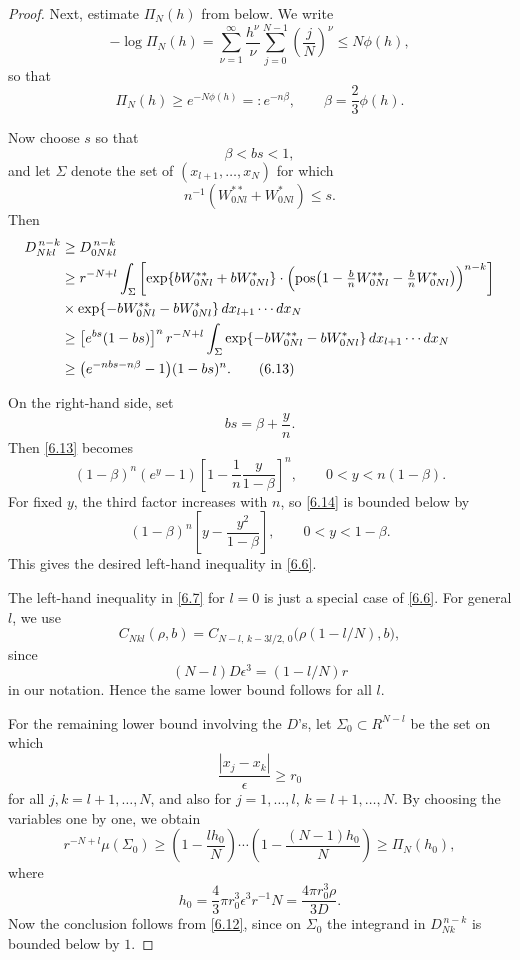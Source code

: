 \documentclass[11pt]{article}
\begin{document}
\begin{proof}
Next, estimate $\Pi_N(h)$ from below. We write
\begin{equation*}
-\log \Pi_N(h)
=
\sum_{\nu=1}^\infty \frac{h^\nu}{\nu}\sum_{j=0}^{N-1}\left(\frac{j}{N}\right)^\nu
\le N\phi(h),
\tag{6.12}\label{6.12}
\end{equation*}
so that
\[
\Pi_N(h)\ge e^{-N\phi(h)}=:e^{-n\beta},
\qquad
\beta=\frac{2}{3}\phi(h).
\]

Now choose $s$ so that
\[
\beta<bs<1,
\]
and let $\Sigma$ denote the set of $(x_{l+1},\dots,x_N)$ for which
\[
n^{-1}(W^{**}_{0Nl}+W^{*}_{0Nl})\le s.
\]
Then
\begin{align*}
D^{\,n-k}_{Nkl}
&\ge D^{\,n-k}_{0Nkl}
\notag\\
&\ge
r^{-N+l}\int_\Sigma
\left[
\exp\{bW^{**}_{0Nl}+bW^{*}_{0Nl}\}
\cdot
\Bigl(\mathrm{pos}\bigl(1-\tfrac{b}{n}W^{**}_{0Nl}-\tfrac{b}{n}W^{*}_{0Nl}\bigr)\Bigr)^{n-k}
\right]
\notag\\
&\times
\exp\{-bW^{**}_{0Nl}-bW^{*}_{0Nl}\}\,dx_{l+1}\cdots dx_N\\
&\ge
\bigl[e^{bs}(1-bs)\bigr]^n
\, r^{-N+l}\int_\Sigma
\exp\{-bW^{**}_{0Nl}-bW^{*}_{0Nl}\}\,dx_{l+1}\cdots dx_N
\notag\\
&\ge
\bigl(e^{-nbs-n\beta}-1\bigr)(1-bs)^n.
\tag{6.13}\label{6.13}
\end{align*}

On the right-hand side, set
\[
bs=\beta+\frac{y}{n}.
\]
Then \eqref{6.13} becomes
\begin{equation}
(1-\beta)^n(e^y-1)\left[1-\frac{1}{n}\frac{y}{1-\beta}\right]^n,
\qquad
0<y<n(1-\beta).
\tag{6.14}\label{6.14}
\end{equation}
For fixed $y$, the third factor increases with $n$, so \eqref{6.14} is bounded below by
\[
(1-\beta)^n\left[y-\frac{y^2}{1-\beta}\right],
\qquad
0<y<1-\beta.
\]
This gives the desired left-hand inequality in \eqref{6.6}.

The left-hand inequality in \eqref{6.7} for $l=0$ is just a special case of \eqref{6.6}. For general $l$, we use
\begin{equation}
C_{Nkl}(\rho,b)
=
C_{N-l,\,k-3l/2,\,0}\bigl(\rho(1-l/N),b\bigr),
\tag{6.15}\label{6.15}
\end{equation}
since
\[
(N-l)D\epsilon^3=(1-l/N)r
\]
in our notation. Hence the same lower bound follows for all $l$.

For the remaining lower bound involving the $D$'s, let $\Sigma_0\subset R^{N-l}$ be the set on which
\[
\frac{|x_j-x_k|}{\epsilon}\ge r_0
\]
for all $j,k=l+1,\dots,N$, and also for $j=1,\dots,l$, $k=l+1,\dots,N$. By choosing the variables one by one, we obtain
\begin{equation}
r^{-N+l}\mu(\Sigma_0)
\ge
\left(1-\frac{lh_0}{N}\right)\cdots
\left(1-\frac{(N-1)h_0}{N}\right)
\ge
\Pi_N(h_0),
\tag{6.16}\label{6.16}
\end{equation}
where
\[
h_0=\frac{4}{3}\pi r_0^3\epsilon^3r^{-1}N=\frac{4\pi r_0^3\rho}{3D}.
\]
Now the conclusion follows from \eqref{6.12}, since on $\Sigma_0$ the integrand in $D^{\,n-k}_{Nk}$ is bounded below by $1$.
\end{proof}
\end{document}
